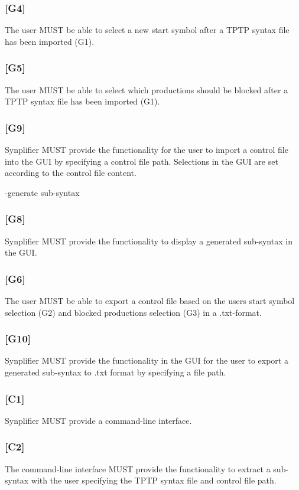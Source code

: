 \subsubsection{[G4]}\label{G4}
The user MUST be able to select a new start symbol after a \ac{TPTP} syntax file has been imported (G1).
\subsubsection{[G5]}\label{G5}
The user MUST be able to select which productions should be blocked after a \ac{TPTP} syntax file has been imported (G1).
\subsubsection{[G9]}\label{G9}
\ac{Synplifier} MUST provide the functionality for the user to import a control file into the GUI by specifying a control file path. Selections in the GUI are set according to the control file content.

-generate sub-syntax
\subsubsection{[G8]}\label{G8}
\ac{Synplifier} MUST provide the functionality to display a generated sub-syntax in the GUI.
\subsubsection{[G6]}\label{G6}
The user MUST be able to export a control file based on the users start symbol selection (G2) and blocked productions selection (G3) in a .txt-format.
\subsubsection{[G10]}\label{G10}
\ac{Synplifier} MUST provide the functionality in the GUI for the user to export a generated sub-syntax to .txt format by specifying a file path.
\subsubsection{[C1]}\label{C1}
\ac{Synplifier} MUST provide a command-line interface.
\subsubsection{[C2]}\label{C2}
The command-line interface MUST provide the functionality to extract a sub-syntax with the user specifying the \ac{TPTP} syntax file and control file path.
